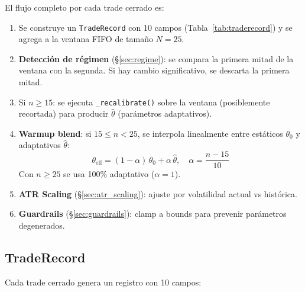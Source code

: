 \documentclass[11pt,a4paper]{article}
\newcommand{\code}[1]{\texttt{\small #1}}
\begin{document}
El flujo completo por cada trade cerrado es:

\begin{enumerate}[leftmargin=2em]
\item Se construye un \code{TradeRecord} con 10 campos (Tabla~\ref{tab:traderecord})
      y se agrega a la ventana FIFO de tama\~no $N=25$.

\item \textbf{Detecci\'on de r\'egimen} (\S\ref{sec:regime}): se compara
      la primera mitad de la ventana con la segunda. Si hay cambio
      significativo, se descarta la primera mitad.

\item Si $n \geq 15$: se ejecuta \code{\_recalibrate()} sobre la
      ventana (posiblemente recortada) para producir $\hat\theta$
      (par\'ametros adaptativos).

\item \textbf{Warmup blend}: si $15 \leq n < 25$, se interpola
      linealmente entre est\'aticos $\theta_0$ y adaptativos $\hat\theta$:
      \begin{equation}
      \theta_{\mathrm{eff}} = (1-\alpha)\,\theta_0 + \alpha\,\hat\theta,
      \quad \alpha = \frac{n - 15}{10}
      \label{eq:warmup}
      \end{equation}
      Con $n \geq 25$ se usa 100\% adaptativo ($\alpha = 1$).

\item \textbf{ATR Scaling} (\S\ref{sec:atr_scaling}): ajuste por
      volatilidad actual vs hist\'orica.

\item \textbf{Guardrails} (\S\ref{sec:guardrails}): clamp a bounds
      para prevenir par\'ametros degenerados.
\end{enumerate}


\subsection{TradeRecord}
\label{sec:traderecord}

Cada trade cerrado genera un registro con 10 campos:
\end{document}
